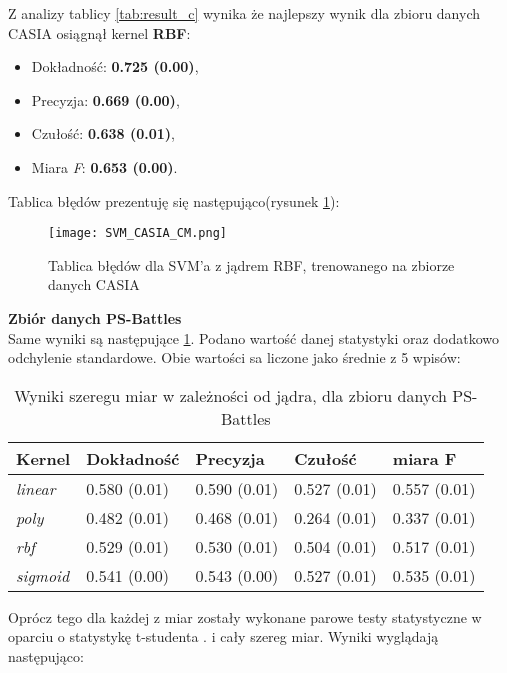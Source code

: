 Z analizy tablicy \ref{tab:result_c} wynika że najlepszy wynik dla zbioru danych CASIA osiągnął kernel \textbf{RBF}:
\begin{itemize}
	\item Dokładność: \textbf{0.725 (0.00)},
	\item Precyzja: \textbf{0.669 (0.00)},
	\item Czułość: \textbf{0.638 (0.01)},
	\item Miara \textit{F}: \textbf{0.653 (0.00)}.
\end{itemize}
Tablica błędów prezentuję się następująco(rysunek \ref{fig:rbf_cm_casia}):

\begin{figure}[h!]
	\texttt{[image: SVM\_CASIA\_CM.png]}
	\centering
	\caption{Tablica błędów dla SVM'a z jądrem RBF, trenowanego na zbiorze danych CASIA}
	\label{fig:rbf_cm_casia}
\end{figure}

\textbf{Zbiór danych PS-Battles} \\

Same wyniki są następujące \ref{tab:result_p}. Podano wartość danej statystyki oraz dodatkowo odchylenie standardowe. Obie wartości sa liczone jako średnie z 5 wpisów:
\begin{table}[h!]
	\centering
	\begin{tabular}{|l|l|l|l|l|}
		\hline
		\textbf{Kernel} & \textbf{Dokładność} & \textbf{Precyzja} & \textbf{Czułość} & \textbf{miara F} \\ \hline
		\textit{linear}  & 0.580 (0.01) & 0.590 (0.01) & 0.527 (0.01) & 0.557 (0.01) \\ \hline
		\textit{poly}    & 0.482 (0.01) & 0.468 (0.01) & 0.264 (0.01) & 0.337 (0.01) \\ \hline
		\textit{rbf}     & 0.529 (0.01) & 0.530 (0.01) & 0.504 (0.01) & 0.517 (0.01) \\ \hline
		\textit{sigmoid} & 0.541 (0.00) & 0.543 (0.00) & 0.527 (0.01) & 0.535 (0.01) \\ \hline
	\end{tabular}
	\caption{Wyniki szeregu miar w zależności od jądra, dla zbioru danych PS-Battles}
	\label{tab:result_p}
\end{table}

Oprócz tego dla każdej z miar zostały wykonane parowe testy statystyczne w oparciu o statystykę t-studenta \cite{stata}. i cały szereg miar.  Wyniki wyglądają następująco:


